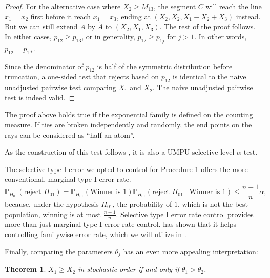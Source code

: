 \documentclass[11pt]{article}
\newtheorem{theorem}[corollary]{Theorem}
\newcommand{\PP}{\mathbb{P}}
\begin{document}
\begin{proof}
For the alternative case where $X_2 \ge M_{13}$, the segment $C$ will reach the line $x_1 = x_2$ first before it reach $x_1 = x_3$, ending at $\left(X_2, X_2, X_1 - X_2 + X_3\right)$ instead. But we can still extend $A$ by $\tilde{A}$ to $\left(X_2, X_1, X_3\right)$. The rest of the proof follows. In either cases, $p_{12} \ge p_{13}$, or in generality, $p_{12} \ge p_{1j}$ for $j > 1$. In other words, $p_{12} = p_{1*}$.

Since the denominator of $p_{12}$ is half of the symmetric distribution before truncation, a one-sided test that rejects based on $p_{12}$ is identical to the naive unadjusted pairwise test comparing $X_1$ and $X_2$. The naive unadjusted pairwise test is indeed valid.
\end{proof}

The proof above holds true if the exponential family is defined on the counting measure. If ties are broken independently and randomly, the end points on the rays can be considered as ``half an atom''.

As the construction of this test follows \citet{Fithian:2014ws}, it is also a UMPU selective level-$\alpha$ test.

The selective type I error we opted to control for Procedure 1 offers the more conventional, marginal type I error rate.
\begin{equation}
\PP_{H_{01}}\left(\text{reject } H_{01}\right) = \PP_{H_{01}}\left(\text{Winner is } 1\right) \PP_{H_{01}}\left(\text{reject } H_{01} \middle| \text{Winner is } 1\right) \le \frac{n-1}{n} \alpha,
\label{eqn:marginal}
\end{equation}
because, under the hypothesis $H_{01}$, the probability of $1$, which is not the best population, winning is at most $\frac{n-1}{n}$. Selective type I error rate control provides more than just marginal type I error rate control. \citet{Fithian:2015uj} has shown that it helps controlling familywise error rate, which we will utilize in .

Finally, comparing the parameters $\theta_j$ has an even more appealing interpretation:

\begin{theorem}
\label{thm:stoch}
$X_1 \ge X_2$ in stochastic order if and only if $\theta_1 > \theta_2$.
\end{theorem}
\end{document}
